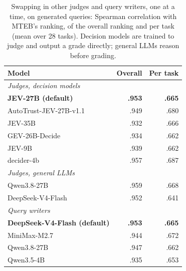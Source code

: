 \begin{table}[t]
\centering\small
\setlength{\tabcolsep}{5pt}
\begin{tabular}{lrr}
\toprule
\textbf{Model} & \textbf{Overall} & \textbf{Per task} \\
\midrule
\multicolumn{3}{l}{\textit{Judges, decision models}} \\
\textbf{JEV-27B (default)} & \textbf{.953} & \textbf{.665} \\
AutoTrust-JEV-27B-v1.1 & .949 & .680 \\
JEV-35B & .932 & .666 \\
GEV-26B-Decide & .934 & .662 \\
JEV-9B & .939 & .662 \\
decider-4b & .957 & .687 \\
\midrule
\multicolumn{3}{l}{\textit{Judges, general LLMs}} \\
Qwen3.8-27B & .959 & .668 \\
DeepSeek-V4-Flash & .952 & .641 \\
\midrule
\multicolumn{3}{l}{\textit{Query writers}} \\
\textbf{DeepSeek-V4-Flash (default)} & \textbf{.953} & \textbf{.665} \\
MiniMax-M2.7 & .944 & .672 \\
Qwen3.8-27B & .947 & .662 \\
Qwen3.5-4B & .935 & .653 \\
\bottomrule
\end{tabular}
\caption{Swapping in other judges and query writers, one at a time, on generated queries: Spearman correlation with MTEB's ranking, of the overall ranking and per task (mean over 28 tasks). Decision models are trained to judge and output a grade directly; general LLMs reason before grading.}
\label{tab:ablations}
\end{table}
